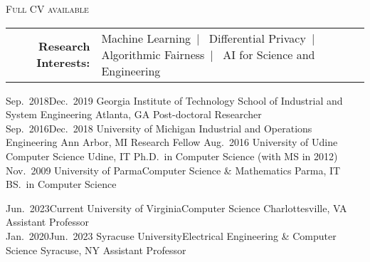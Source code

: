 \documentclass[localFont,alternative]{documentMETADATA}
\begin{document}
\makecvheader\sloppy\allowdisplaybreaks


	\makecvfooter
		{\textsc{}} %
		{\textsc{Full CV available  }}
		{\thepage}


	\begin{tabular}{r l} 
	{\bf Research Interests:} &
	{Machine Learning}~|~
	{Differential Privacy}~|~
	{Algorithmic Fairness}~|~
	{AI for Science and Engineering}
	\end{tabular}


\vspace{-6pt}
\begin{experiences}
  \job
    {Sep.~2018}{Dec.~2019}
    {Georgia Institute of Technology}
    {School of Industrial and System Engineering}
    {Atlanta, GA}
    {Post-doctoral Researcher}\\[-10pt]
  \job
    {Sep.~2016}{Dec.~2018}
    {University of Michigan}
    {Industrial and Operations Engineering}
    {Ann Arbor, MI}
    {Research Fellow}
  \job
    {}{Aug.~2016}
    {University of Udine}%
    {Computer Science}
    {Udine, IT}
    {Ph.D.~in Computer Science (with MS in 2012)}
  \job
    {}{Nov.~2009}
    {University of Parma}{Computer Science \& Mathematics}
    {Parma, IT}
    {BS.~in Computer Science}
\end{experiences}

\vspace{-2pt}
\vspace{-6pt}
\begin{experiences}
  \job
    {Jun.~2023}{Current}
    {University of Virginia}{Computer Science}
    {Charlottesville, VA}
    {Assistant Professor}\\[-10pt]
  \job
    {Jan.~2020}{Jun.~2023}
    {Syracuse University}{Electrical Engineering \& Computer Science}
    {Syracuse, NY}
    {Assistant Professor}
\end{experiences}
\end{document}
